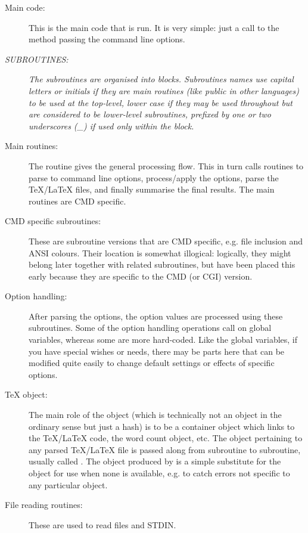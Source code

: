 \documentclass{article}
\begin{document}
\begin{description}
\item[Main \TeXcount{} code:] This is the main code that is run. It is very simple: just a call to the method  passing the command line options.

\item[\em SUBROUTINES:] \textit{The subroutines are organised into blocks. Subroutines names use capital letters or initials if they are main routines (like public in other languages) to be used at the top-level, lower case if they may be used throughout but are considered to be lower-level subroutines, prefixed by one or two underscores (\_) if used only within the block.}

\item[Main routines:] The  routine gives the general processing flow. This in turn calls routines to parse to command line options, process/apply the options, parse the \TeX/\LaTeX{} files, and finally summarise the final results. The main routines are CMD specific.

\item[CMD specific subroutines:] These are subroutine versions that are CMD specific, e.g. file inclusion and ANSI colours. Their location is somewhat illogical: logically, they might belong later together with related subroutines, but have been placed this early because they are specific to the CMD (or CGI) version.

\item[Option handling:] After parsing the options, the option values are processed using these subroutines. Some of the option handling operations call on global variables, whereas some are more hard-coded. Like the global variables, if you have special wishes or needs, there may be parts here that can be modified quite easily to change default settings or effects of specific options.

\item[\TeX{} object:] The main role of the  object (which is technically not an object in the ordinary sense but just a hash) is to be a container object which links to the \TeX/\LaTeX{} code, the word count object, etc. The  object pertaining to any parsed \TeX/\LaTeX{} file is passed along from subroutine to subroutine, usually called . The  object produced by  is a simple substitute for the  object for use when none is available, e.g. to catch errors not specific to any particular  object. 

\item[File reading routines:] These are used to read files and STDIN.


\end{description}
\end{document}
